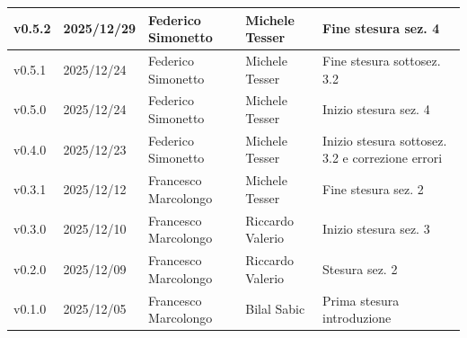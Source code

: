 \documentclass[a4paper,12pt]{article}
\begin{document}
{\begin{center}
\begin{tabularx}{\textwidth}{|l|l|l|l|X|}
            \hline
            v0.5.2 & 2025/12/29 & Federico Simonetto & Michele Tesser & Fine stesura sez. 4\\
            \hline
            v0.5.1 & 2025/12/24 & Federico Simonetto & Michele Tesser & Fine stesura sottosez. 3.2\\
            \hline
            v0.5.0 & 2025/12/24 & Federico Simonetto & Michele Tesser & Inizio stesura sez. 4 \\
            \hline
            v0.4.0 & 2025/12/23 & Federico Simonetto & Michele Tesser & Inizio stesura sottosez. 3.2 e correzione errori \\
            \hline
            v0.3.1 & 2025/12/12 & Francesco Marcolongo & Michele Tesser & Fine stesura sez. 2 \\
            \hline
            v0.3.0 & 2025/12/10 & Francesco Marcolongo & Riccardo Valerio & Inizio stesura sez. 3 \\
            \hline
            v0.2.0 & 2025/12/09 & Francesco Marcolongo & Riccardo Valerio & Stesura sez. 2\\
            \hline
            v0.1.0 & 2025/12/05 & Francesco Marcolongo & Bilal Sabic & Prima stesura introduzione \\
            \hline
        \end{tabularx}
    \end{center}
}

\newpage

\tableofcontents

\newpage



\end{document}
